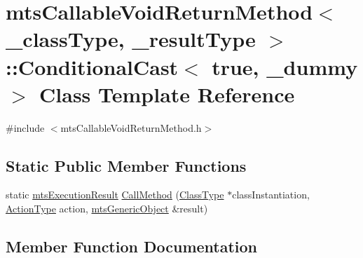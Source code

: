 \hypertarget{classmts_callable_void_return_method_1_1_conditional_cast_3_01true_00_01__dummy_01_4}{}\section{mts\+Callable\+Void\+Return\+Method$<$ \+\_\+class\+Type, \+\_\+result\+Type $>$\+:\+:Conditional\+Cast$<$ true, \+\_\+dummy $>$ Class Template Reference}
\label{classmts_callable_void_return_method_1_1_conditional_cast_3_01true_00_01__dummy_01_4}


{\ttfamily \#include $<$mts\+Callable\+Void\+Return\+Method.\+h$>$}

\subsection*{Static Public Member Functions}
\begin{DoxyCompactItemize}
\item 
static \hyperlink{classmts_execution_result}{mts\+Execution\+Result} \hyperlink{classmts_callable_void_return_method_1_1_conditional_cast_3_01true_00_01__dummy_01_4_ab99bf85a3c5d260e43db1b39f24947cf}{Call\+Method} (\hyperlink{classmts_callable_void_return_method_a2bea77e5dd239ec2a1d3558dd3ca1776}{Class\+Type} $\ast$class\+Instantiation, \hyperlink{classmts_callable_void_return_method_a8fcdd120f008efea73b3d51cbb34f773}{Action\+Type} action, \hyperlink{classmts_generic_object}{mts\+Generic\+Object} \&result)
\end{DoxyCompactItemize}


\subsection{Member Function Documentation}
\hypertarget{classmts_callable_void_return_method_1_1_conditional_cast_3_01true_00_01__dummy_01_4_ab99bf85a3c5d260e43db1b39f24947cf}{}

